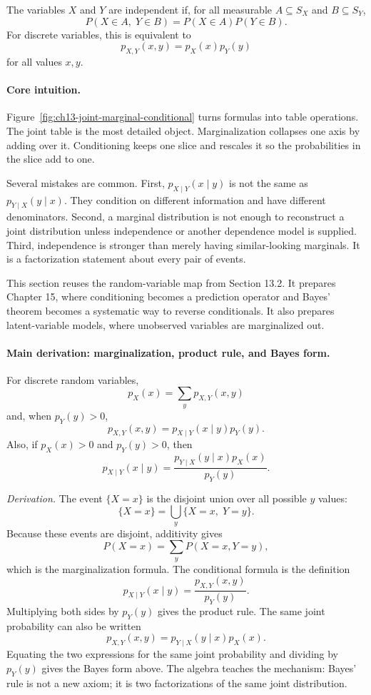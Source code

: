 The variables \(X\) and \(Y\) are independent if, for all measurable \(A\subseteq S_X\) and \(B\subseteq S_Y\),
\[
P(X\in A,\;Y\in B)=P(X\in A)P(Y\in B).
\]
For discrete variables, this is equivalent to
\[
p_{X,Y}(x,y)=p_X(x)p_Y(y)
\]
for all values \(x,y\).

\paragraph{Core intuition.}
Figure~\ref{fig:ch13-joint-marginal-conditional} turns formulas into table operations. The joint table is the most detailed object. Marginalization collapses one axis by adding over it. Conditioning keeps one slice and rescales it so the probabilities in the slice add to one.

Several mistakes are common. First, \(p_{X\mid Y}(x\mid y)\) is not the same as \(p_{Y\mid X}(y\mid x)\). They condition on different information and have different denominators. Second, a marginal distribution is not enough to reconstruct a joint distribution unless independence or another dependence model is supplied. Third, independence is stronger than merely having similar-looking marginals. It is a factorization statement about every pair of events.

This section reuses the random-variable map from Section 13.2. It prepares Chapter 15, where conditioning becomes a prediction operator and Bayes' theorem becomes a systematic way to reverse conditionals. It also prepares latent-variable models, where unobserved variables are marginalized out.

\paragraph{Main derivation: marginalization, product rule, and Bayes form.}
For discrete random variables,
\[
p_X(x)=\sum_y p_{X,Y}(x,y)
\]
and, when \(p_Y(y)>0\),
\[
p_{X,Y}(x,y)=p_{X\mid Y}(x\mid y)p_Y(y).
\]
Also, if \(p_X(x)>0\) and \(p_Y(y)>0\), then
\[
p_{X\mid Y}(x\mid y)
=
\frac{p_{Y\mid X}(y\mid x)p_X(x)}{p_Y(y)}.
\]

\emph{Derivation.}
The event \(\{X=x\}\) is the disjoint union over all possible \(y\) values:
\[
\{X=x\}
=
\bigcup_y \{X=x,\;Y=y\}.
\]
Because these events are disjoint, additivity gives
\[
P(X=x)=\sum_y P(X=x,Y=y),
\]
which is the marginalization formula. The conditional formula is the definition
\[
p_{X\mid Y}(x\mid y)=\frac{p_{X,Y}(x,y)}{p_Y(y)}.
\]
Multiplying both sides by \(p_Y(y)\) gives the product rule. The same joint probability can also be written
\[
p_{X,Y}(x,y)=p_{Y\mid X}(y\mid x)p_X(x).
\]
Equating the two expressions for the same joint probability and dividing by \(p_Y(y)\) gives the Bayes form above. The algebra teaches the mechanism: Bayes' rule is not a new axiom; it is two factorizations of the same joint distribution.

